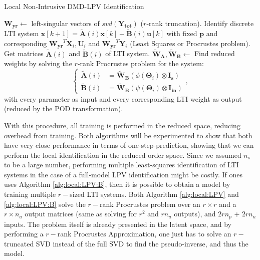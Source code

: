 \begin{algorithm}
  \caption{Local Non-Intrusive DMD-LPV Identification \label{alg:local:LPV:B}}
  \begin{algorithmic}[1] 
    \State $\mathbf{W_{yr}} \gets$ left-singular vectors of $svd(\mathbf{Y_{tot}})$ ($r$-rank truncation).
    \State Identify discrete LTI system $\mathbf{x}[k+1]=\mathbf{\widetilde{A}}(i)\mathbf{x}[k] + \mathbf{\widetilde{B}}(i)\mathbf{u}[k]$ with fixed $\mathbf{p}$ and corresponding $\mathbf{W_{yr}}^T\mathbf{X}_i,\mathbf{U}_i$ and $\mathbf{W_{yr}}^T\mathbf{Y}_i$ (Least Squares or Procrustes problem).
    \State Get matrices $\mathbf{\widetilde{A}}(i)$ and $\mathbf{\widetilde{B}}(i)$ of LTI system.
    \EndFor
    \State $\mathbf{\widetilde{W}_A},\mathbf{\widetilde{W}_B} \gets$ Find reduced weights by solving the $r$-rank Procrustes problem for the system:
    \begin{equation}
   \left \{
\begin{aligned} 
     \mathbf{\widetilde{A}}(i) &=\widetilde{\mathbf{W}}_{\mathbf{B}}(\phi(\boldsymbol{\Theta}_i) \otimes \mathbf{I_s})\\
     \mathbf{\widetilde{B}}(i) &=\widetilde{\mathbf{W}}_{\mathbf{B}}(\psi(\boldsymbol{\Theta}_i) \otimes \mathbf{I_{in}})
\end{aligned},
 \right .
\end{equation}
    with every parameter as input and every corresponding LTI weight as output (reduced by the POD transformation).
  \end{algorithmic}
\end{algorithm}



With this procedure, all training is performed in the reduced space, reducing overhead from training.
%
Both algorithms will be experimented to show that both have very close performance in terms of one-step-prediction, showing that we can perform the local identification in the reduced order space.
%
Since we assumed $n_s$ to be a large number, performing multiple least-squares identification of LTI systems in the case of a full-model LPV identification might be costly.
%
If ones uses Algorithm \ref{alg:local:LPV:B}, then it is possible to obtain a model by training multiple $r-$sized LTI systems.
%
Both Algorithm \ref{alg:local:LPV} and \ref{alg:local:LPV:B} solve the $r-$rank Procrustes problem over an $r \times r$ and a $r \times n_u$ output matrices (same as solving for $r^2$ and $rn_u$ outputs), and $2rn_p$ + $2rn_u$ inputs.
%
The problem itself is already presented in the latent space, and by performing a $r-$rank Procrustes Approximation, one just has to solve an $r-$truncated SVD instead of the full SVD to find the pseudo-inverse, and thus the model.


